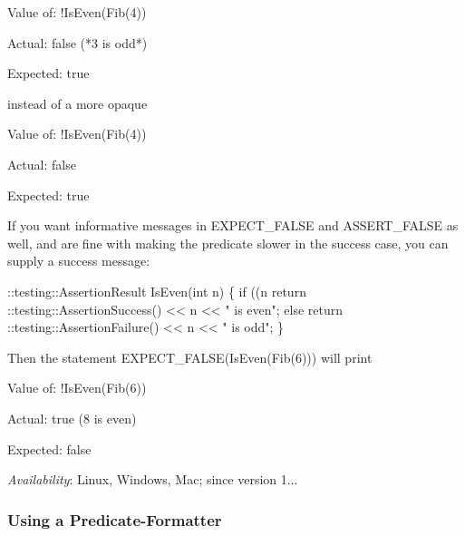 \begin{DoxyPre}
Value of: !IsEven(Fib(4))~\newline

Actual: false (*3 is odd*)~\newline

Expected: true~\newline

\end{DoxyPre}


instead of a more opaque


\begin{DoxyPre}
Value of: !IsEven(Fib(4))~\newline

Actual: false~\newline

Expected: true~\newline

\end{DoxyPre}


If you want informative messages in {\ttfamily E\+X\+P\+E\+C\+T\+\_\+\+F\+A\+L\+SE} and {\ttfamily A\+S\+S\+E\+R\+T\+\_\+\+F\+A\+L\+SE} as well, and are fine with making the predicate slower in the success case, you can supply a success message\+:


\begin{DoxyCode}
::testing::AssertionResult IsEven(int n) \{
  if ((n %
    return ::testing::AssertionSuccess() << n << " is even";
  else
    return ::testing::AssertionFailure() << n << " is odd";
\}
\end{DoxyCode}


Then the statement {\ttfamily E\+X\+P\+E\+C\+T\+\_\+\+F\+A\+L\+SE(Is\+Even(\+Fib(6)))} will print


\begin{DoxyPre}
Value of: !IsEven(Fib(6))~\newline

Actual: true (8 is even)~\newline

Expected: false~\newline

\end{DoxyPre}


{\itshape Availability}\+: Linux, Windows, Mac; since version 1...

\subsubsection*{Using a Predicate-\/\+Formatter}

